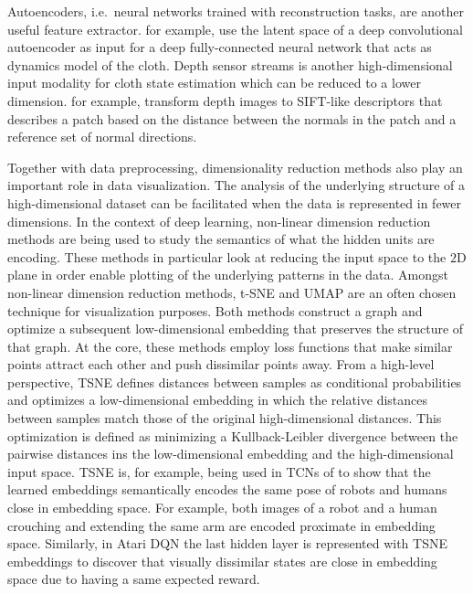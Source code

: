 \documentclass[\home/main.tex]{subfiles}
\begin{document}
Autoencoders, i.e.\ neural networks trained with reconstruction tasks, are another useful feature extractor. \textcite{Yang2017} for example, use the latent space of a deep convolutional autoencoder as input for a deep fully-connected neural network that acts as dynamics model of the cloth. Depth sensor streams is another high-dimensional input modality for cloth state estimation which can be reduced to a lower dimension. \textcite{Ramisa2013} for example, transform depth images to SIFT-like descriptors that describes a patch based on the distance between the normals in the patch and a reference set of normal directions.

Together with data preprocessing, dimensionality reduction methods also play an important role in data visualization. The analysis of the underlying structure of a high-dimensional dataset can be facilitated when the data is represented in fewer dimensions. In the context of deep learning, non-linear dimension reduction methods are being used to study the semantics of what the hidden units are encoding. These methods in particular look at reducing the input space to the $2$D plane in order enable plotting of the underlying patterns in the data. Amongst non-linear dimension reduction methods, t-SNE and UMAP are an often chosen technique for visualization purposes. Both methods construct a graph and optimize a subsequent low-dimensional embedding that preserves the structure of that graph. At the core, these methods employ loss functions that make similar points attract each other and push dissimilar points away. From a high-level perspective, \gls{TSNE} defines distances between samples as conditional probabilities and optimizes a low-dimensional embedding in which the relative distances between samples match those of the original high-dimensional distances. This optimization is defined as minimizing a Kullback-Leibler divergence between the pairwise distances ins the low-dimensional embedding and the high-dimensional input space. \gls{TSNE} is, for example, being used in \glspl{TCN} of \textcite{Sermanet2017TCN} to show that the learned embeddings semantically encodes the same pose of robots and humans close in embedding space. For example, both images of a robot and a human crouching and extending the same arm are encoded proximate in embedding space. Similarly, in Atari DQN \autocite{mnih2015human} the last hidden layer is represented with \gls{TSNE} embeddings to discover that visually dissimilar states are close in embedding space due to having a same expected reward. 
\end{document}
